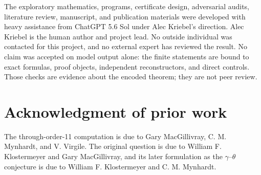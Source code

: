 \documentclass[11pt]{article}
\theoremstyle{definition}
\theoremstyle{remark}
\begin{document}
The exploratory mathematics, programs, certificate design, adversarial
audits, literature review, manuscript, and publication materials were
developed with heavy assistance from ChatGPT 5.6 Sol under Alec Kriebel's
direction.  Alec Kriebel is the human author and project lead.  No outside
individual was contacted for this project, and no external expert has
reviewed the result.  No claim was accepted on model output alone: the
finite statements are bound to exact formulas, proof objects, independent
reconstructors, and direct controls.  Those checks are evidence about the
encoded theorem; they are not peer review.

\section*{Acknowledgment of prior work}

The through-order-11 computation is due to Gary MacGillivray, C. M.
Mynhardt, and V. Virgile.  The original question is due to William F.
Klostermeyer and Gary MacGillivray, and its later formulation as the
\(\gamma\)--\(\theta\) conjecture is due to William F. Klostermeyer and
C. M. Mynhardt.



\end{document}
